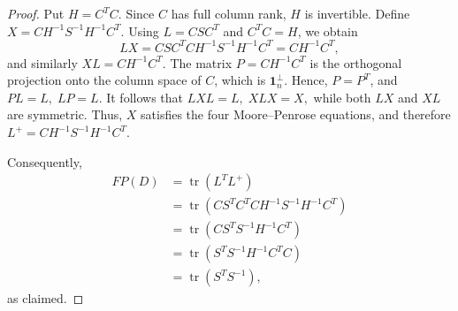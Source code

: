 \documentclass[10pt,a4paper]{amsart}
\begin{document}
\begin{proof}
	Put
	$
	H=C^TC.
	$
	Since $C$ has full column rank, $H$ is invertible. Define
	$
	X=
	CH^{-1}S^{-1}H^{-1}C^T.
	$
	Using $L=CSC^T$ and $C^TC=H$, we obtain
	$$
	LX
	=
	CSC^TCH^{-1}S^{-1}H^{-1}C^T
	=
	CH^{-1}C^T,
	$$
	and similarly
	$
	XL=CH^{-1}C^T.
	$
	The matrix
	$
	P=CH^{-1}C^T
	$
	is the orthogonal projection onto the column space of $C$, which is
	$\mathbf{1}_n^\perp$. Hence, $P=P^T$, and
	$
	PL=L,
	\;
	LP=L.
	$
	It follows that
	$
	LXL=L,
	\;
	XLX=X,
	$
	while both $LX$ and $XL$ are symmetric. Thus, $X$ satisfies the four
	Moore--Penrose equations, and therefore
	$
	L^+=CH^{-1}S^{-1}H^{-1}C^T.
	$
	
	Consequently,
	\begin{align*}
		FP(D)
		&=\operatorname{tr}(L^T L^+)\\
		&=\operatorname{tr}
		\left(
		CS^TC^T
		CH^{-1}S^{-1}H^{-1}C^T
		\right)\\
		&=\operatorname{tr}
		\left(
		CS^TS^{-1}H^{-1}C^T
		\right)\\
		&=\operatorname{tr}
		\left(
		S^TS^{-1}H^{-1}C^TC
		\right)\\
		&=\operatorname{tr}(S^TS^{-1}),
	\end{align*}
	as claimed.
\end{proof}
\end{document}

